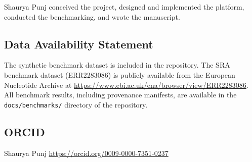 \documentclass[11pt, a4paper]{article}
\begin{document}
Shaurya Punj conceived the project, designed and implemented the
platform, conducted the benchmarking, and wrote the manuscript.


\subsection*{Data Availability Statement}

The synthetic benchmark dataset is included in the repository. The
SRA benchmark dataset (ERR2283086) is publicly available from the
European Nucleotide Archive at
\url{https://www.ebi.ac.uk/ena/browser/view/ERR2283086}. All
benchmark results, including provenance manifests, are available in
the \texttt{docs/benchmarks/} directory of the repository.


\subsection*{ORCID}

Shaurya Punj
\href{https://orcid.org/0009-0000-7351-0237}{https://orcid.org/0009-0000-7351-0237}



\end{document}
